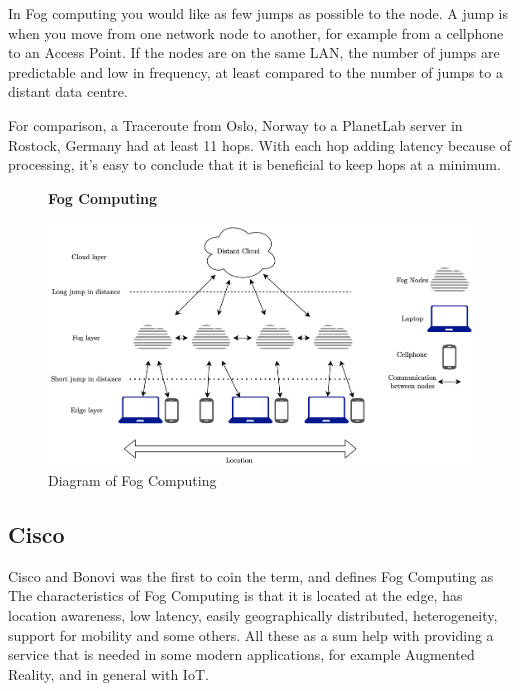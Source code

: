 In Fog computing you would like as few jumps as possible to the node. A jump is when you move from one network node to another, for example from a cellphone to an Access Point. If the nodes are on the same LAN, the number of jumps are predictable and low in frequency, at least compared to the number of jumps to a distant data centre. 


For comparison, a Traceroute\cite{noauthor_traceroute68_nodate} from Oslo, Norway to a PlanetLab server in Rostock, Germany had at least 11 hops. With each hop adding latency because of processing, it’s easy to conclude that it is beneficial to keep hops at a minimum.

\begin{figure}[t]
    \centering
    \textbf{Fog Computing}\par\medskip
    \includegraphics[scale=0.7]{chapters/background/figures/Fog.png}
    \caption{Diagram of Fog Computing}
    \label{fig:FogDiagram}
\end{figure}

\subsection{Cisco}
Cisco\cite{bonomi_fog_nodate} and Bonovi was the first to coin the term, and defines Fog Computing as   The characteristics of Fog Computing is that it is located at the edge, has location awareness, low latency, easily geographically distributed, heterogeneity, support for mobility and some others. All these as a sum help with providing a service that is needed in some modern applications, for example Augmented Reality, and in general with IoT.

